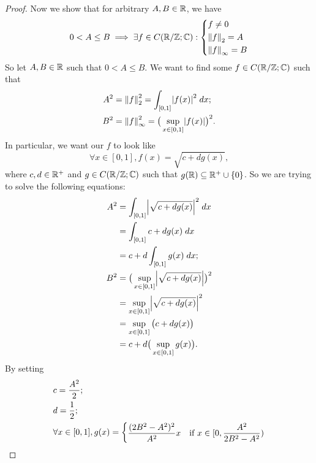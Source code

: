 \begin{proof}
  Now we show that for arbitrary \(A, B \in \R\), we have
  \[
    0 < A \leq B \implies \exists f \in C(\R / \Z ; \C) : \begin{dcases}
      f \neq 0        \\
      \norm*{f}_2 = A \\
      \norm*{f}_{\infty} = B
    \end{dcases}
  \]
  So let \(A, B \in \R\) such that \(0 < A \leq B\).
  We want to find some \(f \in C(\R / \Z ; \C)\) such that
  \begin{align*}
    A^2 & = \norm*{f}_2^2 = \int_{[0, 1]} \abs{f(x)}^2 \; dx;                  \\
    B^2 & = \norm*{f}_{\infty}^2 = \big(\sup_{x \in [0, 1]} \abs{f(x)}\big)^2.
  \end{align*}
  In particular, we want our \(f\) to look like
  \[
    \forall x \in [0, 1], f(x) = \sqrt{c + d g(x)},
  \]
  where \(c, d \in \R^+\) and \(g \in C(\R / \Z ; \C)\) such that \(g(\R) \subseteq \R^+ \cup \{0\}\).
  So we are trying to solve the following equations:
  \begin{align*}
    A^2 & = \int_{[0, 1]} \abs{\sqrt{c + dg(x)}}^2 \; dx           \\
        & = \int_{[0, 1]} c + dg(x) \; dx                          \\
        & = c + d \int_{[0, 1]} g(x) \; dx;                        \\
    B^2 & = \big(\sup_{x \in [0, 1]} \abs{\sqrt{c + dg(x)}}\big)^2 \\
        & = \sup_{x \in [0, 1]} \abs{\sqrt{c + dg(x)}}^2           \\
        & = \sup_{x \in [0, 1]} \big(c + dg(x)\big)                \\
        & = c + d \big(\sup_{x \in [0, 1]} g(x)\big).
  \end{align*}
  By setting
  \begin{align*}
     & c = \dfrac{A^2}{2};                                                                                                                                      \\
     & d = \dfrac{1}{2};                                                                                                                                        \\
     & \forall x \in [0, 1], g(x) = \begin{dcases}
                                      \dfrac{(2 B^2 - A^2)^2}{A^2} x                    & \text{if } x \in [0, \dfrac{A^2}{2 B^2 - A^2})                          \\

\end{dcases}
\end{align*}
\end{proof}
